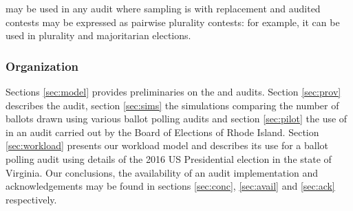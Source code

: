 \Providence may be used in any audit where sampling is with replacement and audited contests may be expressed as pairwise plurality contests: for example, it can be used in plurality and majoritarian elections. 


\subsubsection{Organization} 
Sections \ref{sec:model} provides preliminaries on the \BRAVO and \Minerva audits. Section \ref{sec:prov} describes the \Providence audit, section \ref{sec:sims} the simulations comparing the number of ballots drawn using various ballot polling audits and section \ref{sec:pilot} the use of \Providence in an audit carried out by the Board of Elections of Rhode Island. Section \ref{sec:workload} presents our workload model and describes its use for a ballot polling audit using details of the 2016 US Presidential election in the state of Virginia. Our conclusions, the availability of an audit implementation and acknowledgements may be found in sections \ref{sec:conc}, \ref{sec:avail} and \ref{sec:ack} respectively. 

